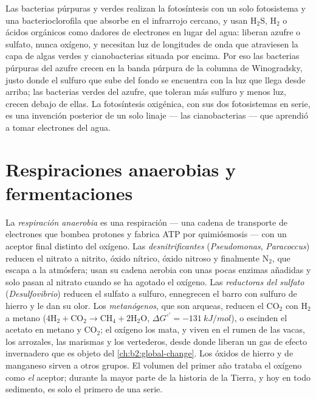 \begin{definition}\label{def:b2:microbial-metabolism:anoxygenic}
Las bacterias púrpuras y verdes realizan la fotosíntesis con un solo
fotosistema y una bacterioclorofila que absorbe en el infrarrojo
cercano, y usan $\mathrm{H_2S}$, $\mathrm{H_2}$ o ácidos orgánicos como
dadores de electrones en lugar del agua: liberan azufre o sulfato, nunca
oxígeno, y necesitan luz de longitudes de onda que atraviesen la capa de
algas verdes y cianobacterias situada por encima. Por eso las bacterias
púrpuras del azufre crecen en la banda púrpura de la columna de
Winogradsky, justo donde el sulfuro que sube del fondo se encuentra con
la luz que llega desde arriba; las bacterias verdes del azufre, que
toleran más sulfuro y menos luz, crecen debajo de ellas. La fotosíntesis
oxigénica, con sus dos fotosistemas en serie, es una invención posterior
de un solo linaje --- las cianobacterias --- que aprendió a tomar
electrones del agua.
\end{definition}

\section{Respiraciones anaerobias y fermentaciones}

\begin{definition}\label{def:b2:microbial-metabolism:anaerobic}
La \emph{respiración anaerobia} es una respiración --- una cadena de
transporte de electrones que bombea protones y fabrica ATP por
quimiósmosis --- con un aceptor final distinto del oxígeno. Las
\emph{desnitrificantes} (\emph{Pseudomonas}, \emph{Paracoccus}) reducen
el nitrato a nitrito, óxido nítrico, óxido nitroso y finalmente
$\mathrm{N_2}$, que escapa a la atmósfera; usan su cadena aerobia con
unas pocas enzimas añadidas y solo pasan al nitrato cuando se ha agotado
el oxígeno. Las \emph{reductoras del sulfato} (\emph{Desulfovibrio})
reducen el sulfato a sulfuro, ennegrecen el barro con sulfuro de hierro y
le dan su olor. Los \emph{metanógenos}, que son arqueas, reducen el
$\mathrm{CO_2}$ con $\mathrm{H_2}$ a
metano ($4\mathrm{H_2} + \mathrm{CO_2} \to \mathrm{CH_4} +
2\mathrm{H_2O}$, $\Delta G^{\circ\prime} = \qty{-131}{kJ/mol}$), o
escinden el acetato en metano y $\mathrm{CO_2}$; el oxígeno los mata, y
viven en el rumen de las vacas, los arrozales, las marismas y los
vertederos, desde donde liberan un gas de efecto invernadero que es
objeto del \cref{ch:b2:global-change}. Los óxidos de hierro y de
manganeso sirven a otros grupos. El volumen del primer año trataba el
oxígeno como \emph{el} aceptor; durante la mayor parte de la historia de
la Tierra, y hoy en todo sedimento, es solo el primero de una serie.
\end{definition}

